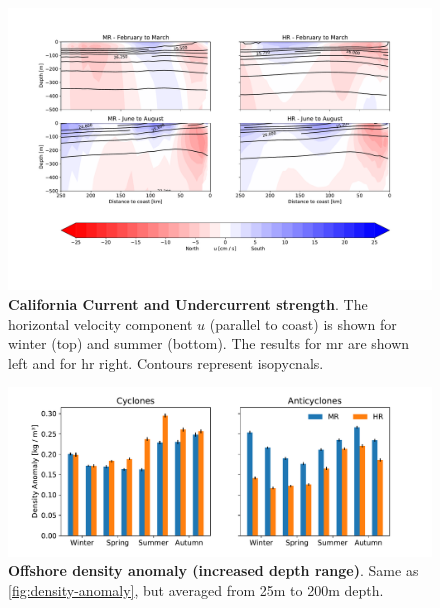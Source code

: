 \begin{figure}
    \centering
    \includegraphics[width=16cm, trim=2cm 0 0 0]{figures/result_undercurrent.pdf}
    \caption[California Current and Undercurrent strength]{\textbf{California Current and Undercurrent strength}. The horizontal velocity component $u$ (parallel to coast) is shown for winter (top) and summer (bottom). The results for \ac{mr} are shown left and for \ac{hr} right. Contours represent isopycnals.}\label{fig:undercurrent}
\end{figure}

\begin{figure}
    \centering
    \hspace*{-0.2cm}\includegraphics[width=16cm, trim=0 0 0 0]{../figures/result_eddies_density2}
    \caption[Offshore density anomaly (increased depth range)]{\textbf{Offshore density anomaly (increased depth range)}. Same as \autoref{fig:density-anomaly}, but averaged from 25m to 200m depth.}\label{fig:density-anomaly2}
\end{figure}

